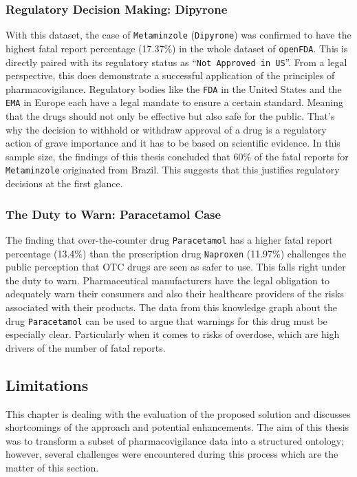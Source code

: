 \subsubsection*{Regulatory Decision Making: Dipyrone}
With this dataset, the case of \texttt{Metaminzole} (\texttt{Dipyrone}) was confirmed to have the highest fatal report percentage (17.37\%) in the whole dataset of \texttt{openFDA}. This is directly paired with its regulatory status as ``\texttt{Not Approved in US}''. From a legal perspective, this does demonstrate a successful application of the principles of pharmacovigilance. Regulatory bodies like the \texttt{FDA} in the United States and the \texttt{EMA} in Europe each have a legal mandate to ensure a certain standard. Meaning that the drugs should not only be effective but also safe for the public. That's why the decision to withhold or withdraw approval of a drug is a regulatory action of grave importance and it has to be based on scientific evidence. In this sample size, the findings of this thesis concluded that 60\% of the fatal reports for \texttt{Metaminzole} originated from Brazil. This suggests that this justifies regulatory decisions at the first glance.
\subsubsection*{The Duty to Warn: Paracetamol Case}
The finding that over-the-counter drug \texttt{Paracetamol} has a higher fatal report percentage (13.4\%) than the prescription drug \texttt{Naproxen} (11.97\%) challenges the public perception that OTC drugs are seen as safer to use.
This falls right under the duty to warn. Pharmaceutical manufacturers have the legal obligation to adequately warn their consumers and also their healthcare providers of the risks associated with their products. The data from this knowledge graph about the drug \texttt{Paracetamol} can be used to argue that warnings for this drug must be especially clear. Particularly when it comes to risks of overdose, which are high drivers of the number of fatal reports.
\subsection{Limitations}
This chapter is dealing with the evaluation of the proposed solution and discusses shortcomings of the approach and potential enhancements. The aim of this thesis was to transform a subset of pharmacovigilance data into a structured ontology; however, several challenges were encountered during this process which are the matter of this section.

